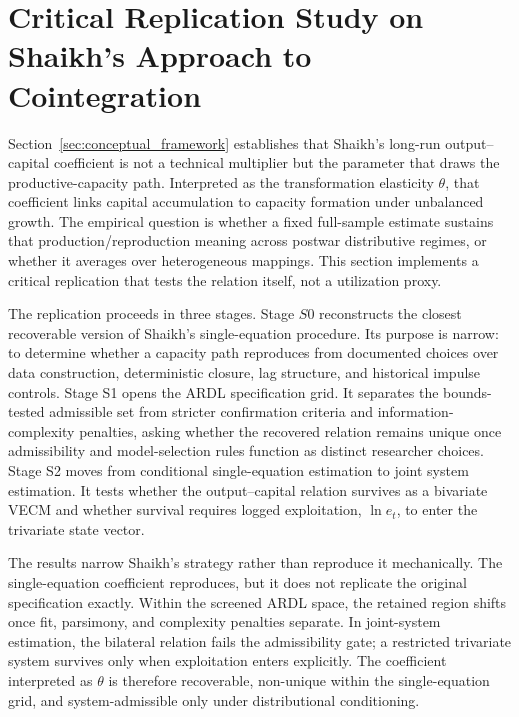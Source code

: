 \documentclass[11pt]{article}
\begin{document}
\section{Critical Replication Study on Shaikh’s Approach to Cointegration}
\label{sec:replication_strategy}

Section~\ref{sec:conceptual_framework} establishes that Shaikh's long-run output--capital coefficient is not a technical multiplier but the parameter that draws the productive-capacity path. Interpreted as the transformation elasticity $\theta$, that coefficient links capital accumulation to capacity formation under unbalanced growth. The empirical question is whether a fixed full-sample estimate sustains that production/reproduction meaning across postwar distributive regimes, or whether it averages over heterogeneous mappings. This section implements a critical replication that tests the relation itself, not a utilization proxy.

The replication proceeds in three stages. Stage $S0$ reconstructs the closest recoverable version of Shaikh's single-equation procedure. Its purpose is narrow: to determine whether a capacity path reproduces from documented choices over data construction, deterministic closure, lag structure, and historical impulse controls. Stage S1 opens the ARDL specification grid. It separates the bounds-tested admissible set from stricter confirmation criteria and information-complexity penalties, asking whether the recovered relation remains unique once admissibility and model-selection rules function as distinct researcher choices. Stage S2 moves from conditional single-equation estimation to joint system estimation. It tests whether the output--capital relation survives as a bivariate VECM and whether survival requires logged exploitation, \(\ln e_t\), to enter the trivariate state vector.

The results narrow Shaikh's strategy rather than reproduce it mechanically. The single-equation coefficient reproduces, but it does not replicate the original specification exactly. Within the screened ARDL space, the retained region shifts once fit, parsimony, and complexity penalties separate. In joint-system estimation, the bilateral relation fails the admissibility gate; a restricted trivariate system survives only when exploitation enters explicitly. The coefficient interpreted as $\theta$ is therefore recoverable, non-unique within the single-equation grid, and system-admissible only under distributional conditioning.
\end{document}
